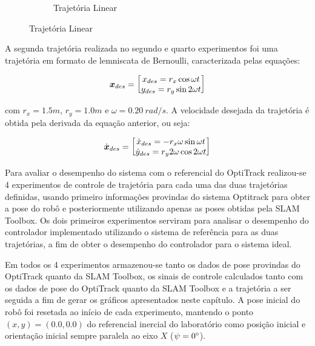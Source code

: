 \begin{figure}[htb]
\begin{subfigure}[b]{0.4\textwidth}
        \caption{Trajetória Linear }
    \end{subfigure}
    \label{fig:exp_trajetorias}
    \sourceParbox[0.8\linewidth]
\end{figure}

A segunda trajetória realizada no segundo e quarto experimentos foi uma trajetória em formato de lemniscata de Bernoulli, caracterizada pelas equações:

\begin{equation}
\label{eq:lemniscata}
    \boldsymbol{x}_{des}=\begin{bmatrix} x_{des}=r_x\cos{\omega t} \\ y_{des}=r_y\sin{2 \omega t} \end{bmatrix}
\end{equation}

com $r_x = 1.5m$, $r_y = 1.0m$ e $\omega = 0.20\ rad/s$. A velocidade desejada da trajetória é obtida pela derivada da equação anterior, ou seja:

\begin{equation}
    \dot{\boldsymbol{x}}_{des}=\begin{bmatrix} \dot{x}_{des} = -r_x \omega \sin{\omega t} \\
    \dot{y}_{des}=r_y 2\omega\cos{2 \omega t} \end{bmatrix}
\end{equation}

Para avaliar o desempenho do sistema com o referencial do OptiTrack realizou-se 4 experimentos de controle de trajetória para cada uma das duas trajetórias definidas, usando primeiro informações provindas do sistema Optitrack para obter a pose do robô e posteriormente utilizando apenas as poses obtidas pela SLAM Toolbox. Os dois primeiros experimentos serviram para analisar o desempenho do controlador implementado utilizando o sistema de referência para as duas trajetórias, a fim de obter o desempenho do controlador para o sistema ideal.

Em todos os 4 experimentos armazenou-se tanto os dados de pose provindas do OptiTrack quanto da SLAM Toolbox, os sinais de controle calculados tanto com os dados de pose do OptiTrack quanto da SLAM Toolbox e a trajetória a ser seguida a fim de gerar os gráficos apresentados neste capítulo. A pose inicial do robô foi resetada ao início de cada experimento, mantendo o ponto $(x,y)=(0.0 ,0.0)$ do referencial inercial do laboratório como posição inicial e orientação inicial sempre paralela ao eixo $X$ ($\psi = 0\degree$).

